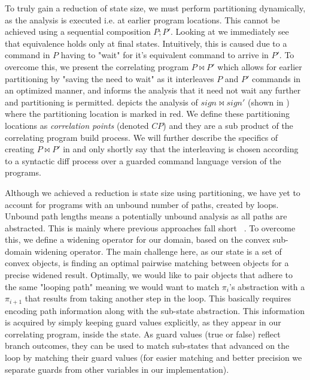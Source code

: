 To truly gain a reduction of state size, we must perform partitioning dynamically, as the analysis is executed i.e. at earlier program locations. This cannot be achieved using a sequential composition $P;P'$. Looking at  we immediately see that equivalence holds only at final states. Intuitively, this is caused due to a command in $P$ having to "wait" for it's equivalent command to arrive in $P'$. To overcome this, we present the correlating program $P \bowtie P'$ which allows for earlier partitioning by "saving the need to wait" as it interleaves $P$ and $P'$ commands in an optimized manner, and informs the analysis that it need not wait any further and partitioning is permitted.  depicts the analysis of $sign \bowtie sign'$ (shown in ) where the partitioning location is marked in red. We define these partitioning locations as \emph{correlation points} (denoted $CP$) and they are a sub product of the correlating program build process. We will further describe the specifics of creating $P \bowtie P'$ in  and only shortly say that the interleaving is chosen according to a syntactic diff process over a guarded command language version of the programs.



Although we achieved a reduction is state size using partitioning, we have yet to account for programs with an unbound number of paths, created by loops. Unbound path lengths means a potentially unbound analysis as all paths are abstracted. This is mainly where previous approaches fall short ~\cite{}. To overcome this, we define a widening operator for our domain, based on the convex sub-domain widening operator. The main challenge here, as our state is a set of convex objects, is finding an optimal pairwise matching between objects for a precise widened result. Optimally, we would like to pair objects that adhere to the same "looping path" meaning we would want to match $\pi_i$'s abstraction with a $\pi_{i+1}$ that results from taking another step in the loop. This basically requires encoding path information along with the sub-state abstraction. This information is acquired by simply keeping guard values explicitly, as they appear in our correlating program, inside the state. As guard values (true or false) reflect branch outcomes, they can be used to match sub-states that advanced on the loop by matching their guard values (for easier matching and better precision we separate guards from other variables in our implementation). 

